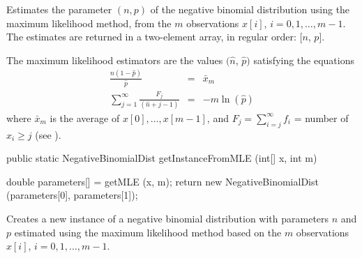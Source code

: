 \begin{tabb}
   Estimates the parameter $(n, p)$ of the negative binomial distribution
   using the maximum likelihood method, from the $m$ observations
   $x[i]$, $i = 0, 1, \ldots, m-1$. The estimates are returned in a two-element
    array, in regular order: [$n$, $p$].
   \begin{detailed}
   The maximum likelihood estimators are the values $(\hat{n}$, $\hat{p})$
   satisfying the equations
   \begin{eqnarray*}
      \frac{\hat{n}(1 - \hat{p})}{\hat{p}} & = & \bar{x}_m\\
     \sum_{j=1}^{\infty} \frac{F_j}{(\hat{n} + j - 1)}  & = & -m\ln (\hat{p})
   \end{eqnarray*}
   where  $\bar x_m$ is the average of $x[0],\dots,x[m-1]$, and
   $F_j = \sum_{i=j}^{\infty} f_i$ = number of $x_i \ge j$ (see
   \cite[page 132]{tJOH69a}).
   \end{detailed}
\end{tabb}
\begin{htmlonly}
\end{htmlonly}
\begin{code}

   public static NegativeBinomialDist getInstanceFromMLE (int[] x, int m)\begin{hide} {
      double parameters[] = getMLE (x, m);
      return new NegativeBinomialDist (parameters[0], parameters[1]);
   }\end{hide}
\end{code}
\begin{tabb}
   Creates a new instance of a negative binomial distribution with
   parameters $n$ and $p$ estimated using the maximum likelihood method
   based on the $m$ observations $x[i]$,   $i = 0, 1, \ldots, m-1$.
\end{tabb}
\begin{htmlonly}
\end{htmlonly}
